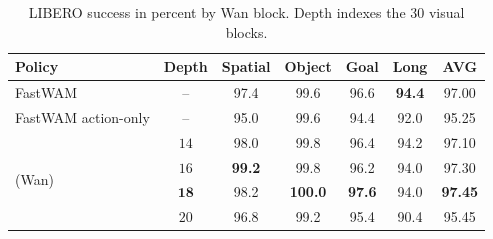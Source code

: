 \begin{table}[ht]
\vspace{-2mm}
\caption{LIBERO success in percent by Wan block. Depth indexes the 30 visual blocks.}
\label{tab:depth}
\begin{center}
\small\setlength{\tabcolsep}{4pt}
\begin{tabular}{lc ccccc}
\toprule
Policy & Depth & Spatial & Object & Goal & Long & AVG \\
\midrule
FastWAM & -- & 97.4 & 99.6 & 96.6 & \textbf{94.4} & 97.00 \\
FastWAM action-only & -- & 95.0 & 99.6 & 94.4 & 92.0 & 95.25 \\
\midrule
\multirow{4}{*}{\modelname{} (Wan)} & $14$ & 98.0 & 99.8 & 96.4 & 94.2 & 97.10 \\
& $16$ & \textbf{99.2} & 99.8 & 96.2 & 94.0 & 97.30 \\
& $\mathbf{18}$ & 98.2 & \textbf{100.0} & \textbf{97.6} & 94.0 & \textbf{97.45} \\
& $20$ & 96.8 & 99.2 & 95.4 & 90.4 & 95.45 \\
\bottomrule
\end{tabular}
\end{center}
\vspace{-2mm}
\end{table}

